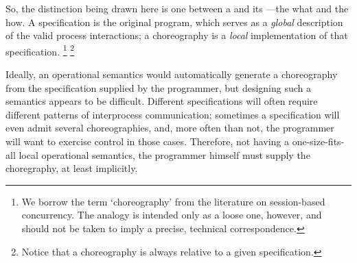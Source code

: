 \documentclass[
  class=../hdeyoung-proposal,
  crop=false
]{standalone}
\begin{document}
So, the distinction being drawn here is one between a  and its ---the what and the how.
A specification is the original program, which serves as a \emph{global} description of the valid process interactions; a choreography is a \emph{local} implementation of that specification.%
\footnote{We borrow the term \enquote*{choreography} from the literature on session-based concurrency.
The analogy is intended only as a loose one, however, and should not be taken to imply a precise, technical correspondence.}%
\footnote{Notice that a choreography is always relative to a given specification.}

Ideally, an operational semantics would automatically generate a choreography from the specification supplied by the programmer, but designing such a semantics appears to be difficult.
Different specifications will often require different patterns of interprocess communication;
sometimes a specification will even admit several choreographies, and, more often than not, the programmer will want to exercise control in those cases.
Therefore, not having a one-size-fits-all local operational semantics, the programmer himself must supply the choregraphy, at least implicitly.
\end{document}
